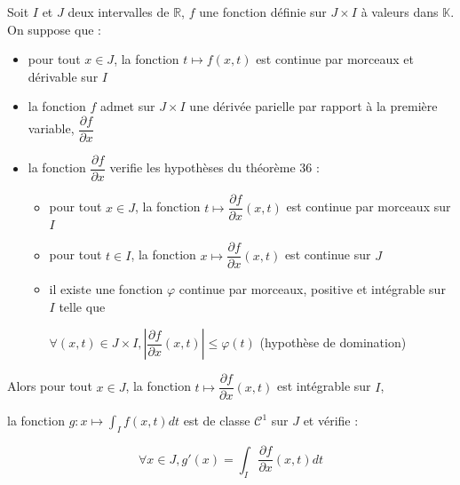 \documentclass[a4paper,12pt]{book}
\newcommand{\Thr}[2]{\begin{tcolorbox}[sharp corners, colback=white,colframe=red!10!blue!30!green!75!, title=Théorème : #1]#2\end{tcolorbox}}
\def\R{\mathbb{R}}
\def\K{\mathbb{K}}
\begin{document}
\Thr{Dérivabilité}{Soit $I$ et $J$ deux intervalles de $\R$, $f$ une fonction définie sur $J\times I$ à valeurs dans $\K$. On suppose que :\begin{itemize}
\item pour tout $x\in J$, la fonction $t\mapsto f(x,t)$ est continue par morceaux et dérivable sur $I$
\item la fonction $f$ admet sur $J\times I$ une dérivée parielle par rapport à la première variable, $\dfrac{\partial f}{\partial x}$
\item la fonction $\dfrac{\partial f}{\partial x}$ verifie les hypothèses du théorème 36 :\begin{itemize}
	\item pour tout $x\in J$, la fonction $t\mapsto \dfrac{\partial f}{\partial x}(x,t)$ est continue par morceaux sur $I$
	\item pour tout $t\in I$, la fonction $x\mapsto \dfrac{\partial f}{\partial x}(x,t)$ est continue sur $J$
	\item il existe une fonction $\varphi$ continue par morceaux, positive et intégrable sur $I$ telle que
	\par \begin{center}$\forall (x,t)\in J\times I, \left\vert\dfrac{\partial f}{\partial x}(x,t)\right\vert\leq\varphi(t)$ (hypothèse de domination) \end{center}
\end{itemize}
\end{itemize}
Alors pour tout $x\in J$, la fonction $t\mapsto \dfrac{\partial f}{\partial x}(x,t)$ est intégrable sur $I$,
\par la fonction $g:x\mapsto \int_If(x,t)dt$ est de classe $\mathcal{C}^1$ sur $J$ et vérifie :
\par $$\forall x\in J, g'(x)=\int_I\dfrac{\partial f}{\partial x}(x,t)dt$$}
\end{document}
